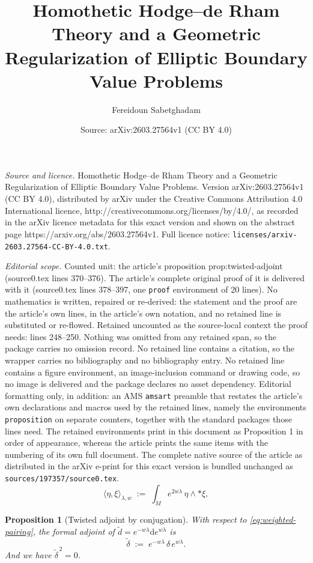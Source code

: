 \documentclass[10pt,a4paper]{amsart}
\title{Homothetic Hodge–de Rham Theory and a Geometric Regularization of Elliptic Boundary Value Problems}
\author{Fereidoun Sabetghadam}
\date{Source: arXiv:2603.27564v1 (CC BY 4.0)}
\newtheorem{proposition}{Proposition}
\newcommand{\dd}{\mathrm{d}}
\newcommand{\wtd}{\tilde d}
\newcommand{\wtdel}{\tilde\delta}
\begin{document}
\maketitle

\noindent\emph{Source and licence.} Homothetic Hodge–de Rham Theory and a Geometric Regularization of Elliptic Boundary Value Problems. Version arXiv:2603.27564v1 (CC BY 4.0), distributed by arXiv under the Creative Commons Attribution 4.0 International licence, http://creativecommons.org/licenses/by/4.0/, as recorded in the arXiv licence metadata for this exact version and shown on the abstract page https://arxiv.org/abs/2603.27564v1. Full licence notice: \texttt{licenses/arxiv-2603.27564-CC-BY-4.0.txt}.\par\smallskip

\noindent\textit{Editorial scope.} Counted unit: the article's proposition prop:twisted-adjoint (source0.tex lines 370--376). The article's complete original proof of it is delivered with it (source0.tex lines 378--397, one \texttt{proof} environment of 20 lines). No mathematics is written, repaired or re-derived: the statement and the proof are the article's own lines, in the article's own notation, and no retained line is substituted or re-flowed.  Retained uncounted as the source-local context the proof needs: lines 248--250.  Nothing was omitted from any retained span, so the package carries no omission record.  No retained line contains a citation, so the wrapper carries no bibliography and no bibliography entry.  No retained line contains a figure environment, an image-inclusion command or drawing code, so no image is delivered and the package declares no asset dependency.  Editorial formatting only, in addition: an AMS \texttt{amsart} preamble that restates the article's own declarations and macros used by the retained lines, namely the environments \texttt{proposition} on separate counters, together with the standard packages those lines need.  The retained environments print in this document as Proposition 1 in order of appearance, whereas the article prints the same items with the numbering of its own full document.  The complete native source of the article as distributed in the arXiv e-print for this exact version is bundled unchanged as \texttt{sources/197357/source0.tex}.
\begin{equation}\label{eq:weighted-pairing}
\langle \eta,\xi\rangle_{\lambda,w} \;:=\; \int_M e^{2w\lambda}\,\eta\wedge *\xi,
\end{equation}

\begin{proposition}[Twisted adjoint by conjugation]\label{prop:twisted-adjoint}
With respect to \eqref{eq:weighted-pairing}, the formal adjoint of $\wtd=e^{-w\lambda}\dd e^{w\lambda}$ is
\begin{equation}\label{eq:tilde-delta}
\wtdel \;:=\; e^{-w\lambda}\,\delta\,e^{w\lambda}.
\end{equation}
And we have $\wtdel^{\,2}=0$. 
\end{proposition}
\end{document}
